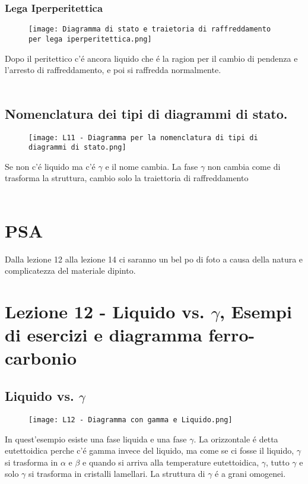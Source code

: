 \documentclass{article}
\begin{document}
{            \subsubsection{Lega Iperperitettica}
                \begin{figure}[h!]
                    \centering
                    \texttt{[image: Diagramma di stato e traietoria di raffreddamento per lega iperperitettica.png]}
                \end{figure}
                Dopo il peritettico c'\'e ancora liquido che \'e la ragion per il cambio di pendenza e l'arresto di raffreddamento, e poi si raffredda normalmente.\\ \\
        \subsection{Nomenclatura dei tipi di diagrammi di stato.}
            \begin{figure}[h!]
                \centering
                \texttt{[image: L11 - Diagramma per la nomenclatura di tipi di diagrammi di stato.png]}
            \end{figure}
            Se non c'\'e liquido ma c'\'e $\gamma$ e il nome cambia. La fase $\gamma$ non cambia come di trasforma la struttura, cambio solo la traiettoria di raffreddamento\\ \\
    \newpage

    \section{PSA}
        Dalla lezione 12 alla lezione 14 ci saranno un bel po di foto a causa della natura e complicatezza del materiale dipinto.
    \section{Lezione 12 - Liquido vs. $\gamma$, Esempi di esercizi e diagramma ferro-carbonio}
        \subsection{Liquido vs. $\gamma$}
            \begin{figure}[h!]
                \centering
                \texttt{[image: L12 - Diagramma con gamma e Liquido.png]}
            \end{figure}
            In quest'esempio esiste una fase liquida e una fase $\gamma$. La orizzontale \'e detta eutettoidica perche c'\'e gamma invece del liquido, ma come se ci fosse il liquido, $\gamma$ si trasforma in $\alpha$ e $\beta$ e quando si arriva alla temperature eutettoidica, $\gamma$, tutto $\gamma$ e solo $\gamma$ si trasforma in cristalli lamellari. La struttura di $\gamma$ \'e a grani omogenei.
}
\end{document}
